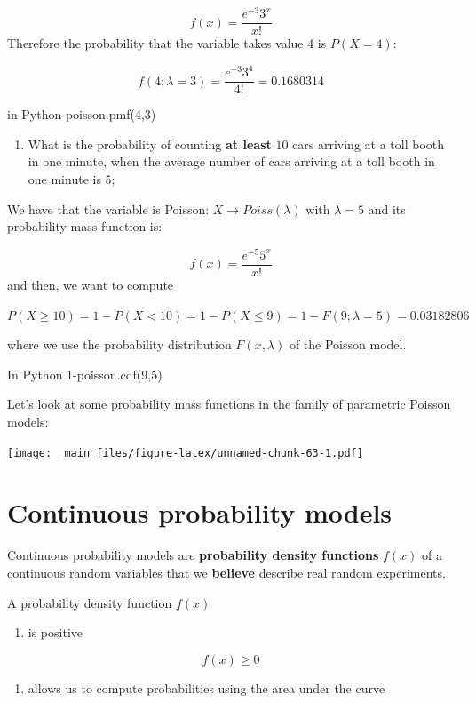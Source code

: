 \documentclass[
]{book}
\providecommand{\tightlist}{%
  \setlength{\itemsep}{0pt}\setlength{\parskip}{0pt}}
\begin{document}
\[f(x)= \frac{e^{-3}3^x}{x!}\]
Therefore the probability that the variable takes value 4 is \(P(X=4)\):

\[f(4; \lambda=3)= \frac{e^{-3}3^4}{4!}=0.1680314\]

in Python poisson.pmf(4,3)

\begin{enumerate}
\def\labelenumi{\arabic{enumi})}
\setcounter{enumi}{2}
\tightlist
\item
  What is the probability of counting \textbf{at least} \(10\) cars arriving at a toll booth in one minute, when the average number of cars arriving at a toll booth in one minute is \(5\);
\end{enumerate}

We have that the variable is Poisson: \(X \rightarrow Poiss(\lambda)\) with \(\lambda=5\) and its probability mass function is:

\[f(x)= \frac{e^{-5}5^x}{x!}\]
and then, we want to compute

\(P(X\geq 10)=1-P(X < 10)=1-P(X \leq 9)=1-F(9; \lambda=5)=0.03182806\)

where we use the probability distribution \(F(x,\lambda)\) of the Poisson model.

In Python 1-poisson.cdf(9,5)

Let's look at some probability mass functions in the family of parametric Poisson models:

\texttt{[image: \_main\_files/figure-latex/unnamed-chunk-63-1.pdf]}

\hypertarget{continuous-probability-models}{%
\section{Continuous probability models}\label{continuous-probability-models}}

Continuous probability models are \textbf{probability density functions} \(f(x)\) of a continuous random variables that we \textbf{believe} describe real random experiments.

A probability density function \(f(x)\)

\begin{enumerate}
\def\labelenumi{\arabic{enumi})}
\tightlist
\item
  is positive
\end{enumerate}

\[f(x) \geq 0\]

\begin{enumerate}
\def\labelenumi{\arabic{enumi})}
\setcounter{enumi}{1}
\tightlist
\item
  allows us to compute probabilities using the area under the curve
\end{enumerate}
\end{document}
